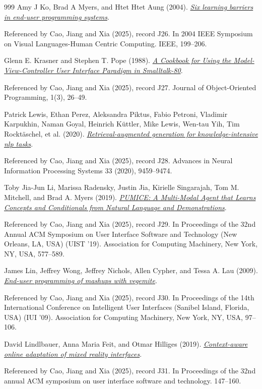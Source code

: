\documentclass[11pt,letterpaper]{article}
\begin{document}
\begin{thebibliography}{999}
Amy J Ko, Brad A Myers, and Htet Htet Aung (2004).
\href{https://www.cs.cmu.edu/~NatProg/papers/Ko2004LearningBarriers.pdf}{\emph{Six learning barriers in end-user programming systems}}.
\par {\small Referenced by Cao, Jiang and Xia (2025), record J26. In 2004 IEEE Symposium on Visual Languages-Human Centric Computing. IEEE, 199–206.}

Glenn E. Krasner and Stephen T. Pope (1988).
\href{https://www.lri.fr/~mbl/ENS/FONDIHM/2013/papers/Krasner-JOOP88.pdf}{\emph{A Cookbook for Using the Model-View-Controller User Interface Paradigm in Smalltalk-80}}.
\par {\small Referenced by Cao, Jiang and Xia (2025), record J27. Journal of Object-Oriented Programming, 1(3), 26–49.}

Patrick Lewis, Ethan Perez, Aleksandra Piktus, Fabio Petroni, Vladimir Karpukhin, Naman Goyal, Heinrich Küttler, Mike Lewis, Wen-tau Yih, Tim Rocktäschel, et al. (2020).
\href{https://arxiv.org/abs/2005.11401}{\emph{Retrieval-augmented generation for knowledge-intensive nlp tasks}}.
\par {\small Referenced by Cao, Jiang and Xia (2025), record J28. Advances in Neural Information Processing Systems 33 (2020), 9459–9474.}

Toby Jia-Jun Li, Marissa Radensky, Justin Jia, Kirielle Singarajah, Tom M. Mitchell, and Brad A. Myers (2019).
\href{https://doi.org/10.1145/3332165.3347899}{\emph{PUMICE: A Multi-Modal Agent that Learns Concepts and Conditionals from Natural Language and Demonstrations}}.
\par {\small Referenced by Cao, Jiang and Xia (2025), record J29. In Proceedings of the 32nd Annual ACM Symposium on User Interface Software and Technology (New Orleans, LA, USA) (UIST ’19). Association for Computing Machinery, New York, NY, USA, 577–589.}

James Lin, Jeffrey Wong, Jeffrey Nichols, Allen Cypher, and Tessa A. Lau (2009).
\href{https://doi.org/10.1145/1502650.1502667}{\emph{End-user programming of mashups with vegemite}}.
\par {\small Referenced by Cao, Jiang and Xia (2025), record J30. In Proceedings of the 14th International Conference on Intelligent User Interfaces (Sanibel Island, Florida, USA) (IUI ’09). Association for Computing Machinery, New York, NY, USA, 97–106.}

David Lindlbauer, Anna Maria Feit, and Otmar Hilliges (2019).
\href{https://arxiv.org/html/2503.04084v1\#bib.bib32}{\emph{Context-aware online adaptation of mixed reality interfaces}}.
\par {\small Referenced by Cao, Jiang and Xia (2025), record J31. In Proceedings of the 32nd annual ACM symposium on user interface software and technology. 147–160.}


\end{thebibliography}
\end{document}
